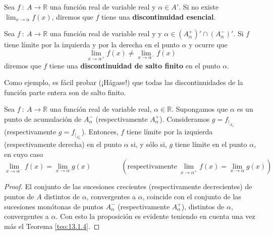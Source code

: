 \begin{definicion}
    Sea $f ~:~ A \longrightarrow \mathbb{R}$ una función real de variable real y $\alpha \in A'$.
    Si no existe $\displaystyle\lim_{x \to \alpha} f(x)$, diremos que $f$ tiene una \textbf{discontinuidad esencial}.
\end{definicion}
\begin{definicion}
    Sea $f ~:~ A \longrightarrow \mathbb{R}$ una función real de variable real y y $\alpha \in (A_{\alpha}^{+})' \cap (A_{\alpha}^{-})'$.
    Si $f$ tiene límite por la izquierda y por la derecha en el punto $\alpha$ y ocurre que
    \begin{equation*}
        \lim_{x \to \alpha^{+}} f(x) \neq \lim_{x \to \alpha^{-}} f(x)
    \end{equation*}
    diremos que $f$ tiene una \textbf{discontinuidad de salto finito} en el punto $\alpha$.
\end{definicion}

Como ejemplo, es fácil probar (¡Hágase!) que todas las discontinuidades de la función parte entera son de salto finito.

\begin{prop}
    Sea $f ~:~ A \longrightarrow \mathbb{R}$ una función real de variable real, $\alpha \in \mathbb{R}$.
    Supongamos que $\alpha$ es un punto de acumulación de $A_{\alpha}^{-}$ (respectivamente $A_{\alpha}^{+}$).
    Consideramos $g = f_{|_{A_{\alpha}^{-}}}$ (respectivamente $g = f_{|_{A_{\alpha}^{+}}}$).
    Entonces, $f$ tiene límite por la izquierda (respectivamente derecha) en el punto $\alpha$ si, y sólo si,
    $g$ tiene límite en el punto $\alpha$, en cuyo caso
    \begin{equation*}
        \displaystyle\lim_{x \to \alpha^{-}} f(x) = \displaystyle\lim_{x \to \alpha} g(x) ~ \qquad \qquad (\text{respectivamente} ~ \displaystyle\lim_{x \to \alpha^{+}} f(x) = \displaystyle\lim_{x \to \alpha} g(x))
    \end{equation*}
\end{prop}
\begin{proof}
    El conjunto de las sucesiones crecientes (respectivamente decrecientes) de puntos de $A$ distintos de $\alpha$, convergentes a $\alpha$, coincide con el conjunto de las sucesiones monótonas de puntos $A_{\alpha}^{-}$ (respectivamente $A_{\alpha}^{+}$), distintos de $\alpha$, convergentes a $\alpha$. Con esto la proposición es evidente teniendo en cuenta una vez más el Teorema \ref{teo:13.1.4}. 
\end{proof}



